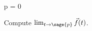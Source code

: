 \documentclass{ximera}
\author{Jim Fowler}
\begin{document}
\begin{sagesilent}
  p = 0
\end{sagesilent}

\begin{exercise}

  Compute $\lim_{t \to \sage{p}} \vec{f}(t)$.


  
\end{exercise}
\end{document}
